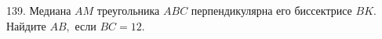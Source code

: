 139. Медиана $AM$ треугольника $ABC$ перпендикулярна его биссектрисе $BK.$ Найдите $AB,$ если $BC=12.$\\
